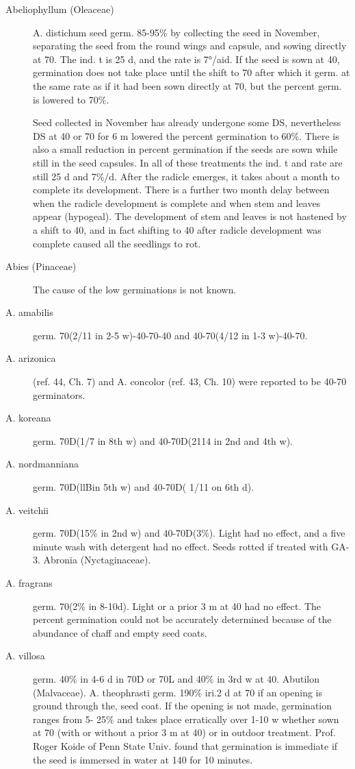 \begin{description}
\item[Abeliophyllum (Oleaceae)] A. distichum seed germ. 85-95\% by collecting
the seed in November, separating the seed from the round wings and capsule, and
sowing directly at 70. The ind. t is 25 d, and the rate is 7°/aid. If the seed is sown at 40,
germination does not take place until the shift to 70 after which it germ. at the same
rate as if it had been sown directly at 70, but the percent germ. is lowered to 70\%.

Seed collected in November has already undergone some DS, nevertheless DS at 40
or 70 for 6 m lowered the percent germination to 60\%. There is also a small reduction
in percent germination if the seeds are sown while still in the seed capsules. In all of
these treatments the ind. t and rate are still 25 d and 7\%/d. After the radicle emerges, it
takes about a month to complete its development. There is a further two month delay
between when the radicle development is complete and when stem and leaves
appear (hypogeal). The development of stem and leaves is not hastened by a shift to
40, and in fact shifting to 40 after radicle development was complete caused all the
seedlings to rot.

\item[Abies (Pinaceae)] The cause of the low germinations is not known.
\item[A. amabilis] germ. 70(2/11 in 2-5 w)-40-70-40 and 40-70(4/12 in 1-3 w)-40-70.
\item[A. arizonica] (ref. 44, Ch. 7) and A. concolor (ref. 43, Ch. 10) were reported to be 40-70
germinators.
\item[A. koreana] germ. 70D(1/7 in 8th w) and 40-70D(2114 in 2nd and 4th w).
\item[A. nordmanniana] germ. 70D(llBin 5th w) and 40-70D( 1/11 on 6th d).
\item[A. veitchii] germ. 70D(15\% in 2nd w) and 40-70D(3\%). Light had no effect, and
a five minute wash with detergent had no effect. Seeds rotted if treated with GA-3.
Abronia (Nyctaginaceae).
\item[A. fragrans] germ. 70(2\% in 8-10d). Light or a prior 3 m at 40 had no effect. The
percent germination could not be accurately determined because of the abundance of
chaff and empty seed coats.

\item[A. villosa] germ. 40\% in 4-6 d in 70D or 70L and 40\% in 3rd w at 40.
Abutilon (Malvaceae). A. theophrasti germ. 190\% iri.2 d at 70 if an opening
is ground through the, seed coat. If the opening is not made, germination ranges from 5-
25\% and takes place erratically over 1-10 w whether sown at 70 (with or without a
prior 3 m at 40) or in outdoor treatment. Prof. Roger Koide of Penn State Univ. found
that germination is immediate if the seed is immersed in water at 140 for 10 minutes.
\end{description}

